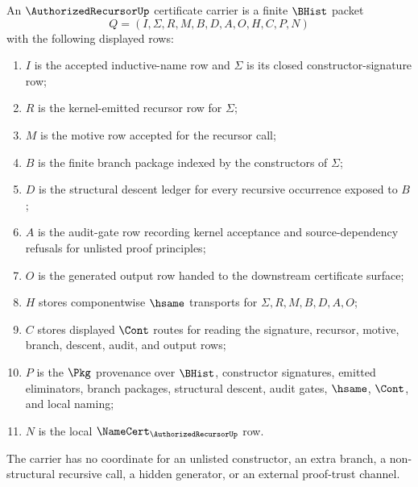 \begin{definition}
\label{def:recursor-generator-certificate-carrier}
An $\AuthorizedRecursorUp$ certificate carrier is a finite $\BHist$ packet
$$
Q=(I,\Sigma,R,M,B,D,A,O,H,C,P,N)
$$
with the following displayed rows:
\begin{enumerate}
\item $I$ is the accepted inductive-name row and $\Sigma$ is its closed constructor-signature row;
\item $R$ is the kernel-emitted recursor row for $\Sigma$;
\item $M$ is the motive row accepted for the recursor call;
\item $B$ is the finite branch package indexed by the constructors of $\Sigma$;
\item $D$ is the structural descent ledger for every recursive occurrence exposed to $B$;
\item $A$ is the audit-gate row recording kernel acceptance and source-dependency refusals for unlisted proof principles;
\item $O$ is the generated output row handed to the downstream certificate surface;
\item $H$ stores componentwise $\hsame$ transports for $\Sigma,R,M,B,D,A,O$;
\item $C$ stores displayed $\Cont$ routes for reading the signature, recursor, motive, branch, descent, audit, and output rows;
\item $P$ is the $\Pkg$ provenance over $\BHist$, constructor signatures, emitted eliminators, branch packages, structural descent, audit gates, $\hsame$, $\Cont$, and local naming;
\item $N$ is the local $\NameCert_{\AuthorizedRecursorUp}$ row.
\end{enumerate}
The carrier has no coordinate for an unlisted constructor, an extra branch, a non-structural recursive call, a hidden generator, or an external proof-trust channel.
\end{definition}

